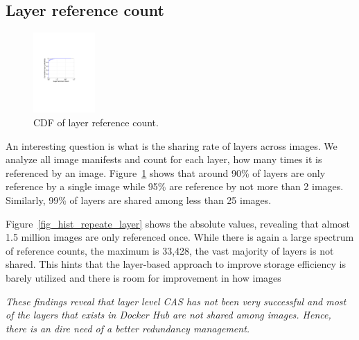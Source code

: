 \subsection{Layer reference count}

\begin{figure}
	\centering
	\includegraphics[width=0.21\textwidth]{graphs/shared-cnt-cdf.pdf}
	\caption{CDF of layer reference count.
	}
	\label{fig:ref_count}
\end{figure}

An interesting question is what is the sharing rate of layers across images.
We analyze all image manifests and count for each layer, how many times it is
referenced by an image. Figure~\ref{fig:ref_count} shows that around 90\% of
layers are only reference by a single image while 95\% are reference by not
more than 2 images. Similarly, 99\% of layers are shared among less than 25
images. 

Figure~\ref{fig_hist_repeate_layer} shows the absolute values, revealing that
almost 1.5 million images are only referenced once.   While there is again a large spectrum of reference counts, the maximum
is 33,428, the vast majority of layers is not shared. This hints that the
layer-based approach to improve storage efficiency is barely utilized and there
is room for improvement in how images

\emph{These findings reveal that layer level CAS has not been very successful
and most of the layers that exists in Docker Hub are not shared among images.
Hence, there is an dire need of a better redundancy management.}

